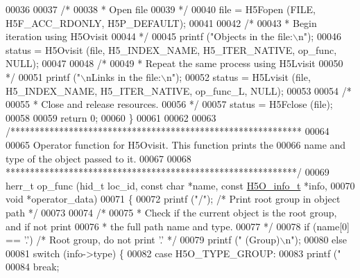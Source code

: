 \begin{DoxyCode}
00036 
00037     \textcolor{comment}{/*}
00038 \textcolor{comment}{     * Open file}
00039 \textcolor{comment}{     */}
00040     file = H5Fopen (FILE, H5F\_ACC\_RDONLY, H5P\_DEFAULT);
00041 
00042     \textcolor{comment}{/*}
00043 \textcolor{comment}{     * Begin iteration using H5Ovisit}
00044 \textcolor{comment}{     */}
00045     printf (\textcolor{stringliteral}{"Objects in the file:\(\backslash\)n"});
00046     status = H5Ovisit (file, H5\_INDEX\_NAME, H5\_ITER\_NATIVE, op\_func, NULL);
00047 
00048     \textcolor{comment}{/*}
00049 \textcolor{comment}{     * Repeat the same process using H5Lvisit}
00050 \textcolor{comment}{     */}
00051     printf (\textcolor{stringliteral}{"\(\backslash\)nLinks in the file:\(\backslash\)n"});
00052     status = H5Lvisit (file, H5\_INDEX\_NAME, H5\_ITER\_NATIVE, op\_func\_L, NULL);
00053 
00054     \textcolor{comment}{/*}
00055 \textcolor{comment}{     * Close and release resources.}
00056 \textcolor{comment}{     */}
00057     status = H5Fclose (file);
00058 
00059     \textcolor{keywordflow}{return} 0;
00060 \}
00061 
00062 
00063 \textcolor{comment}{/************************************************************}
00064 \textcolor{comment}{}
00065 \textcolor{comment}{  Operator function for H5Ovisit.  This function prints the}
00066 \textcolor{comment}{  name and type of the object passed to it.}
00067 \textcolor{comment}{}
00068 \textcolor{comment}{ ************************************************************/}
00069 herr\_t op\_func (hid\_t loc\_id, \textcolor{keyword}{const} \textcolor{keywordtype}{char} *name, \textcolor{keyword}{const} \hyperlink{struct_h5_o__info__t}{H5O\_info\_t} *info,
00070             \textcolor{keywordtype}{void} *operator\_data)
00071 \{
00072     printf (\textcolor{stringliteral}{"/"});               \textcolor{comment}{/* Print root group in object path */}
00073 
00074     \textcolor{comment}{/*}
00075 \textcolor{comment}{     * Check if the current object is the root group, and if not print}
00076 \textcolor{comment}{     * the full path name and type.}
00077 \textcolor{comment}{     */}
00078     \textcolor{keywordflow}{if} (name[0] == \textcolor{charliteral}{'.'})         \textcolor{comment}{/* Root group, do not print '.' */}
00079         printf (\textcolor{stringliteral}{"  (Group)\(\backslash\)n"});
00080     \textcolor{keywordflow}{else}
00081         \textcolor{keywordflow}{switch} (info->type) \{
00082             \textcolor{keywordflow}{case} H5O\_TYPE\_GROUP:
00083                 printf (\textcolor{stringliteral}{"%
00084                 \textcolor{keywordflow}{break};
}
\end{DoxyCode}
